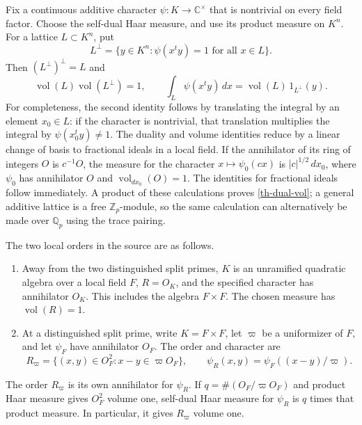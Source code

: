 Fix a continuous additive character $\psi:K\to\mathbb C^\times$ that is
nontrivial on every field factor.  Choose the self-dual Haar measure, and
use its product measure on $K^n$.  For a lattice $L\subset K^n$, put
\[
 L^\perp=\{y\in K^n:\psi(x^ty)=1\text{ for all }x\in L\}.
\]
Then $(L^\perp)^\perp=L$ and
\begin{equation}\label{th-dual-vol}
 \operatorname{vol}(L)\operatorname{vol}(L^\perp)=1,
 \qquad
 \int_L\psi(x^ty)\,dx=
 \operatorname{vol}(L)\,1_{L^\perp}(y).
\end{equation}
For completeness, the second identity follows by translating the integral
by an element $x_0\in L$: if the character is nontrivial, that translation
multiplies the integral by $\psi(x_0^ty)\ne1$.  The duality and volume
identities reduce by a linear change of basis to fractional ideals in a
local field.  If the annihilator of its ring of integers $O$ is $c^{-1}O$,
the measure for the character $x\mapsto\psi_0(cx)$ is
$|c|^{1/2}\,dx_0$, where $\psi_0$ has annihilator $O$ and
$\operatorname{vol}_{dx_0}(O)=1$.  The identities for fractional ideals
follow immediately.  A product of these calculations proves
\eqref{th-dual-vol}; a general additive lattice is a free
$\mathbb Z_p$-module, so the same calculation can alternatively be made
over $\mathbb Q_p$ using the trace pairing.

The two local orders in the source are as follows.

\begin{enumerate}
\item Away from the two distinguished split primes, $K$ is an unramified
quadratic algebra over a local field $F$, $R=O_K$, and the specified
character has annihilator $O_K$.  This includes the algebra $F\times F$.
The chosen measure has $\operatorname{vol}(R)=1$.
\item At a distinguished split prime, write $K=F\times F$, let $\varpi$
be a uniformizer of $F$, and let $\psi_F$ have annihilator $O_F$.  The
order and character are
\begin{equation}\label{th-split-order}
 R_\varpi=\{(x,y)\in O_F^2:x-y\in\varpi O_F\},
 \qquad
 \psi_R(x,y)=\psi_F((x-y)/\varpi).
\end{equation}
\end{enumerate}

\begin{lemma}\label{th-split-self-dual}
The order $R_\varpi$ is its own annihilator for $\psi_R$.
If $q=\#(O_F/\varpi O_F)$ and product Haar measure gives $O_F^2$
volume one, self-dual Haar measure for $\psi_R$ is $q$ times that
product measure.  In particular, it gives $R_\varpi$ volume one.
\end{lemma}

